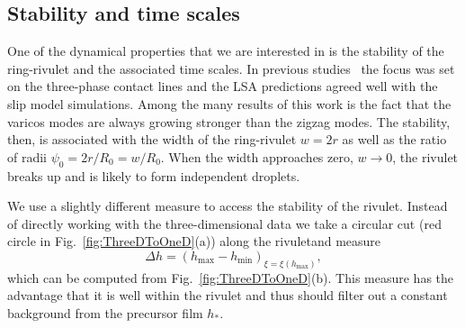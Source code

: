 \documentclass[twoside,twocolumn,9pt]{article}
\begin{document}
\subsection{Stability and time scales}\label{subsec:stability}
One of the dynamical properties that we are interested in is the stability of the ring-rivulet and the associated time scales.
In previous studies~\cite{gonzalezStabilityLiquidRing2013} the focus was set on the three-phase contact lines and the LSA predictions agreed well with the slip model simulations.
Among the many results of this work is the fact that the varicos modes are always growing stronger than the zigzag modes.
The stability, then, is associated with the width of the ring-rivulet $w = 2r$ as well as the ratio of radii $\psi_0 = 2r/R_0 = w/R_0$.
When the width approaches zero, $w \rightarrow 0$, the rivulet breaks up and is likely to form independent droplets.

We use a slightly different measure to access the stability of the rivulet. 
Instead of directly working with the three-dimensional data we take a circular cut (red circle in Fig.~\ref{fig:ThreeDToOneD}(a)) along the rivuletand measure
\begin{equation}\label{eq:delta-h-measure}
    \Delta h = (h_{\max} - h_{\min})_{\xi = \xi(h_{\max})},
\end{equation}
which can be computed from Fig.~\ref{fig:ThreeDToOneD}(b).
This measure has the advantage that it is well within the rivulet and thus should filter out a constant background from the precursor film $h_{\ast}$.
\end{document}
